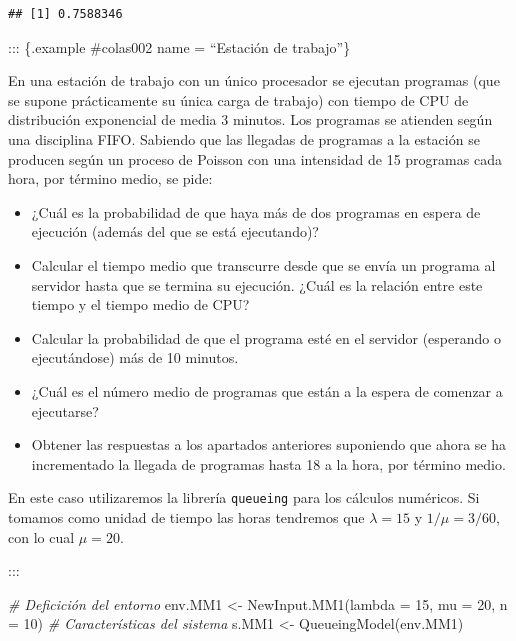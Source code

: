 \documentclass[
]{book}
\newenvironment{Shaded}{\begin{snugshade}}{\end{snugshade}}
\newcommand{\AttributeTok}[1]{\textcolor[rgb]{0.77,0.63,0.00}{#1}}
\newcommand{\CommentTok}[1]{\textcolor[rgb]{0.56,0.35,0.01}{\textit{#1}}}
\newcommand{\DecValTok}[1]{\textcolor[rgb]{0.00,0.00,0.81}{#1}}
\newcommand{\FunctionTok}[1]{\textcolor[rgb]{0.00,0.00,0.00}{#1}}
\newcommand{\NormalTok}[1]{#1}
\newcommand{\OtherTok}[1]{\textcolor[rgb]{0.56,0.35,0.01}{#1}}
\newcommand{\SpecialCharTok}[1]{\textcolor[rgb]{0.00,0.00,0.00}{#1}}
\providecommand{\tightlist}{%
  \setlength{\itemsep}{0pt}\setlength{\parskip}{0pt}}
\theoremstyle{definition}
\theoremstyle{definition}
\theoremstyle{definition}
\theoremstyle{definition}
\theoremstyle{remark}
\begin{document}
\begin{Shaded}
\end{Shaded}

\begin{verbatim}
## [1] 0.7588346
\end{verbatim}

::: \{.example \#colas002 name = ``Estación de trabajo''\}

En una estación de trabajo con un único procesador se ejecutan programas (que se supone prácticamente su única carga de trabajo) con tiempo de CPU de distribución exponencial de media 3 minutos. Los programas se atienden según una disciplina FIFO. Sabiendo que las llegadas de programas a la estación se producen según un proceso de Poisson con una intensidad de 15 programas cada hora, por término medio, se pide:

\begin{itemize}
\tightlist
\item
  ¿Cuál es la probabilidad de que haya más de dos programas en espera de ejecución (además del que se está ejecutando)?
\item
  Calcular el tiempo medio que transcurre desde que se envía un programa al servidor hasta que se termina su ejecución. ¿Cuál es la relación entre este tiempo y el tiempo medio de CPU?
\item
  Calcular la probabilidad de que el programa esté en el servidor (esperando o ejecutándose) más de 10 minutos.
\item
  ¿Cuál es el número medio de programas que están a la espera de comenzar a ejecutarse?
\item
  Obtener las respuestas a los apartados anteriores suponiendo que ahora se ha incrementado la llegada de programas hasta 18 a la hora, por término medio.
\end{itemize}

En este caso utilizaremos la librería \texttt{queueing} para los cálculos numéricos. Si tomamos como unidad de tiempo las horas tendremos que \(\lambda = 15\) y \(1/\mu = 3 /60\), con lo cual \(\mu = 20.\)

:::

\begin{Shaded}
\begin{Highlighting}[]
\CommentTok{\# Deficición del entorno}
\NormalTok{env.MM1 }\OtherTok{\textless{}{-}} \FunctionTok{NewInput.MM1}\NormalTok{(}\AttributeTok{lambda =} \DecValTok{15}\NormalTok{, }\AttributeTok{mu =} \DecValTok{20}\NormalTok{, }\AttributeTok{n =} \DecValTok{10}\NormalTok{)}
\CommentTok{\# Características del sistema}
\NormalTok{s.MM1 }\OtherTok{\textless{}{-}} \FunctionTok{QueueingModel}\NormalTok{(env.MM1)}
\end{Highlighting}
\end{Shaded}
\end{document}
